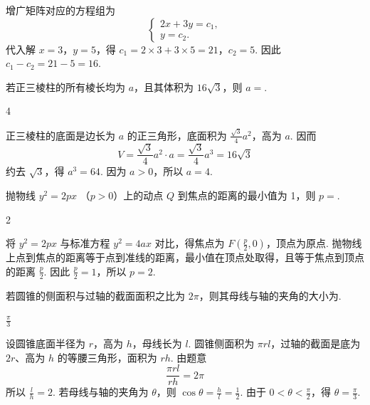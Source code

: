\begin{solution}
增广矩阵对应的方程组为
\[
\begin{cases}
2x+3y=c_1,\\
y=c_2.
\end{cases}
\]
代入解 \(x=3\)，\(y=5\)，得 \(c_1=2\times3+3\times5=21\)，\(c_2=5\). 因此 \(c_1-c_2=21-5=16\).
\end{solution}

\begin{problem}
若正三棱柱的所有棱长均为 \(a\)，且其体积为 \(16\sqrt{3}\)，则 \(a = \)\fillinblank{}.
\end{problem}

\begin{answer}
4
\end{answer}

\begin{solution}
正三棱柱的底面是边长为 \(a\) 的正三角形，底面积为 \(\frac{\sqrt{3}}{4}a^2\)，高为 \(a\). 因而
\[
V=\frac{\sqrt{3}}{4}a^2\cdot a=\frac{\sqrt{3}}{4}a^3=16\sqrt{3}
\]
约去 \(\sqrt{3}\)，得 \(a^3=64\). 因为 \(a>0\)，所以 \(a=4\).
\end{solution}

\begin{problem}
抛物线 \( y^{2} = 2px  \) （\(p > 0\)）上的动点 \(Q\) 到焦点的距离的最小值为 1，则 \(p =\)\fillinblank{}.
\end{problem}

\begin{answer}
2
\end{answer}

\begin{solution}
将 \(y^2=2px\) 与标准方程 \(y^2=4ax\) 对比，得焦点为 \(F\left(\frac p2,0\right)\)，顶点为原点. 抛物线上点到焦点的距离等于点到准线的距离，最小值在顶点处取得，且等于焦点到顶点的距离 \(\frac p2\). 因此 \(\frac p2=1\)，所以 \(p=2\).
\end{solution}

\begin{problem}
若圆锥的侧面积与过轴的截面面积之比为 \(2\pi\)，则其母线与轴的夹角的大小为\fillinblank{}.
\end{problem}

\begin{answer}
\(\frac{\pi}{3}\)
\end{answer}

\begin{solution}
设圆锥底面半径为 \(r\)，高为 \(h\)，母线长为 \(l\). 圆锥侧面积为 \(\pi rl\)，过轴的截面是底为 \(2r\)、高为 \(h\) 的等腰三角形，面积为 \(rh\). 由题意
\[
\frac{\pi rl}{rh}=2\pi
\]
所以 \(\frac lh=2\). 若母线与轴的夹角为 \(\theta\)，则 \(\cos\theta=\frac hl=\frac12\). 由于 \(0<\theta<\frac\pi2\)，得 \(\theta=\frac\pi3\).
\end{solution}

